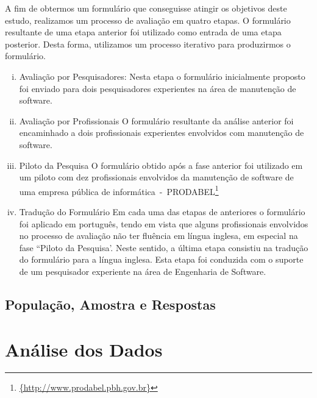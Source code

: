 A fim de obtermos um formulário que conseguisse atingir os objetivos deste estudo, realizamos um
processo de avaliação em quatro etapas. O formulário resultante de uma etapa anterior foi utilizado como entrada de uma etapa posterior. Desta forma, utilizamos um processo iterativo para produzirmos o formulário.
\begin{enumerate}[(i)]
	\item Avaliação por Pesquisadores: Nesta etapa o formulário inicialmente proposto foi enviado para dois pesquisadores experientes na área de manutenção de software.
	\item Avaliação por Profissionais O formulário resultante da análise anterior foi encaminhado a dois profissionais experientes envolvidos com manutenção de software. 
	\item Piloto da Pesquisa O formulário obtido após a fase anterior foi utilizado em um piloto com
		dez profissionais envolvidos da manutenção de software de uma empresa pública de informática~-~PRODABEL\footnote{\url{{http://www.prodabel.pbh.gov.br}}}
	\item Tradução do Formulário Em cada uma das etapas de anteriores o formulário foi aplicado em
		português, tendo em vista que alguns profissionais envolvidos no processo de avaliação não
		ter fluência em língua inglesa, em especial na fase ``Piloto da Pesquisa'. Neste sentido, a última etapa  consistiu na tradução do formulário para a língua inglesa.  Esta etapa foi conduzida com  o suporte de um pesquisador experiente na área de Engenharia de Software.	
\end{enumerate}

\subsection{População, Amostra e Respostas}
\label{subsec:populacao_amostra_respostas}


\section{Análise dos Dados}
\label{sec:analise_dados}

